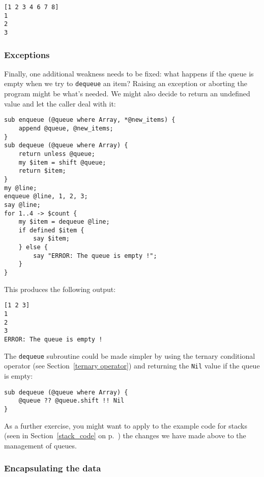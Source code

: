 \begin{verbatim}
[1 2 3 4 6 7 8]
1
2
3
\end{verbatim}

\subsubsection{Exceptions}

Finally, one additional weakness needs to be fixed: what 
happens if the queue is empty when we try to {\tt dequeue} 
an item? Raising an exception or aborting the program 
might be what's needed. We might also decide to return an 
undefined value and let the caller deal with it:

\begin{verbatim}
sub enqueue (@queue where Array, *@new_items) {
    append @queue, @new_items;
}
sub dequeue (@queue where Array) {
    return unless @queue;
    my $item = shift @queue;
    return $item;
}
my @line;
enqueue @line, 1, 2, 3;
say @line;
for 1..4 -> $count {
    my $item = dequeue @line;
    if defined $item {
        say $item;
    } else {
        say "ERROR: The queue is empty !";
    }
}
\end{verbatim}

This produces the following output:

\begin{verbatim}
[1 2 3]
1
2
3
ERROR: The queue is empty !
\end{verbatim}

The {\tt dequeue} subroutine could be made simpler by 
using the ternary conditional operator (see 
Section~\ref{ternary operator}) and returning the {\tt Nil} 
value if the queue is empty:

\begin{verbatim}
sub dequeue (@queue where Array) {
    @queue ?? @queue.shift !! Nil
}
\end{verbatim}


As a further exercise, you might want to apply to the 
example code for stacks (seen in Section~\ref{stack_code} 
on p.~\pageref{stack_code}) the changes we have made 
above to the management of queues.

\subsubsection{Encapsulating the data}
\label{functional_queue}

